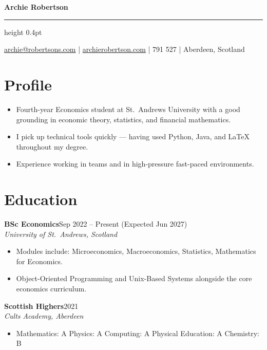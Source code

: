 \documentclass[10pt, a4paper]{article}
\newcommand{\entry}[3]{%
  \vspace{3pt}
  \noindent
  \textbf{\color{charcoal}#1}\hfill{\color{mgrey}\small #3}\\[-2pt]
  {\color{myblue}\itshape\small #2}
  \vspace{1pt}
}
\begin{document}
{\fontsize{26pt}{30pt}\selectfont\rmfamily\bfseries\color{charcoal} Archie Robertson}

\vspace{3pt}
{\color{lgrey}\hrule height 0.4pt}
\vspace{2pt}
{\small\color{mgrey}
  \href{mailto:archie@robertsons.com}{archie@robertsons.com}
  \quad\textcolor{lgrey}{|}
  \quad \href{https://archierobertson.com}{archierobertson.com}
  \quad\textcolor{lgrey}{|}
   791 527
  \quad\textcolor{lgrey}{|}
  \quad Aberdeen, Scotland
  
}
\vspace{2pt}

\section{Profile}

\begin{itemize}
  \item Fourth-year Economics student at St.\ Andrews University with a good grounding in economic theory, statistics, and financial mathematics.
  \item I pick up technical tools quickly --- having used Python, Java, and LaTeX throughout my degree.
  \item Experience working in teams and in high-pressure fast-paced environments.
  \end{itemize}

\section{Education}

\entry{BSc Economics}{University of St.\ Andrews, Scotland}{Sep 2022 -- Present (Expected Jun 2027)}
\begin{itemize}
  \item Modules include: Microeconomics, Macroeconomics, Statistics, Mathematics for Economics.
  \item Object-Oriented Programming and Unix-Based Systems alongside the core economics curriculum.
\end{itemize}
\entry{Scottish Highers}{Cults Academy, Aberdeen}{2021}
\begin{itemize}
  \item Mathematics: A \enspace Physics: A \enspace Computing: A \enspace Physical Education: A \enspace Chemistry: B
\end{itemize}
\end{document}

